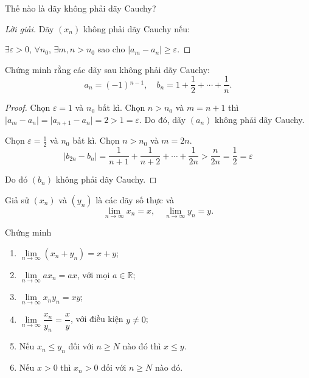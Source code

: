 \documentclass[class=analysis,crop=false]{standalone}
\begin{document}
\begin{exercise}
    Thế nào là dãy không phải dãy Cauchy?
\end{exercise}

\begin{proof}[Lời giải]
    \par Dãy $(x_{n})$ không phải dãy Cauchy nếu:
    \par $\exists\varepsilon > 0$, $\forall n_{0}$, $\exists m, n > n_{0}$ sao cho $\vert a_{m} - a_{n}\vert \ge \varepsilon$.
\end{proof}

\begin{exercise}
    Chứng minh rằng các dãy sau không phải dãy Cauchy:
    \[
        a_{n} = (-1){}^{n-1},\quad b_{n} = 1 + \frac{1}{2} + \cdots + \frac{1}{n}.
    \]
\end{exercise}

\begin{proof}
    \par Chọn $\varepsilon = 1$ và $n_{0}$ bất kì. Chọn $n > n_{0}$ và $m = n + 1$ thì $\vert a_{m} - a_{n}\vert = \vert a_{n+1} - a_{n}\vert = 2 > 1 = \varepsilon$. Do đó, dãy $(a_{n})$ không phải dãy Cauchy.
    \bigskip
    \par Chọn $\varepsilon = \frac{1}{2}$ và $n_{0}$ bất kì. Chọn $n > n_{0}$ và $m = 2n$.
    \[
        \vert b_{2n} - b_{n}\vert = \frac{1}{n+1} + \frac{1}{n+2} + \cdots + \frac{1}{2n} > \frac{n}{2n} = \frac{1}{2} = \varepsilon
    \]
    \par Do đó $(b_{n})$ không phải dãy Cauchy.
\end{proof}

\begin{exercise}\label{chapter1:limit-and-operators}
    Giả sử $(x_{n})$ và $(y_{n})$ là các dãy số thực và
    \[
        \lim\limits_{n\to\infty} x_{n} = x,\quad\lim\limits_{n\to\infty} y_{n} = y.
    \]
    \par Chứng minh
    \begin{enumerate}[label = (\roman*)]
        \item $\lim\limits_{n\to\infty}(x_{n} + y_{n}) = x + y$;
        \item $\lim\limits_{n\to\infty} ax_{n} = ax$, với mọi $a\in\mathbb{R}$;
        \item $\lim\limits_{n\to\infty} x_{n}y_{n} = xy$;
        \item $\lim\limits_{n\to\infty} \dfrac{x_{n}}{y_{n}} = \dfrac{x}{y}$, với điều kiện $y\ne 0$;
        \item Nếu $x_{n}\le y_{n}$ đối với $n\ge N$ nào đó thì $x\le y$.
        \item Nếu $x > 0$ thì $x_{n} > 0$ đối với $n\ge N$ nào đó.
    \end{enumerate}
\end{exercise}
\end{document}
